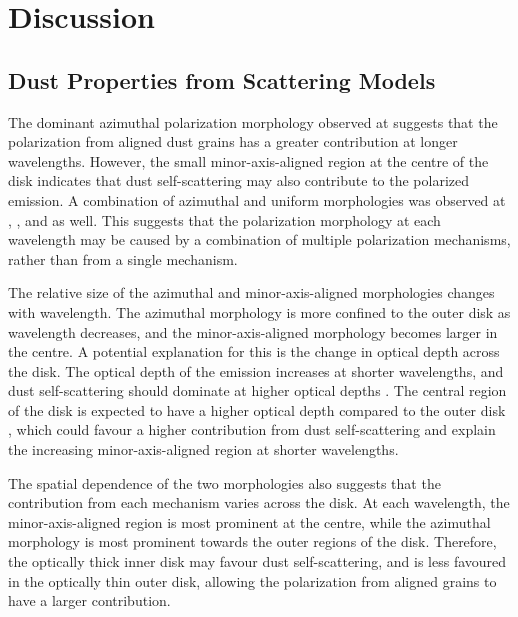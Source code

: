 \chapter{Discussion}
\label{ch_discussion}









\section{Dust Properties from Scattering Models}
The dominant azimuthal polarization morphology observed at \bfour suggests that the polarization from aligned dust grains has a greater contribution at longer wavelengths. However, the small minor-axis-aligned region at the centre of the disk indicates that dust self-scattering may also contribute to the polarized emission. A combination of azimuthal and uniform morphologies was observed at \bfiveNS, \bsixNS, and \bseven as well. This suggests that the polarization morphology at each wavelength may be caused by a combination of multiple polarization mechanisms, rather than from a single mechanism.


The relative size of the azimuthal and minor-axis-aligned morphologies changes with wavelength. The azimuthal morphology is more confined to the outer disk as wavelength decreases, and the minor-axis-aligned morphology becomes larger in the centre. A potential explanation for this is the change in optical depth across the disk. The optical depth of the emission increases at shorter wavelengths, and dust self-scattering should dominate at higher optical depths \citep{Williams, Lin2022}. The central region of the disk is expected to have a higher optical depth compared to the outer disk \citep{Williams}, which could favour a higher contribution from dust self-scattering and explain the increasing minor-axis-aligned region at shorter wavelengths. 

The spatial dependence of the two morphologies also suggests that the contribution from each mechanism varies across the disk. At each wavelength, the minor-axis-aligned region is most prominent at the centre, while the azimuthal morphology is most prominent towards the outer regions of the disk. Therefore, the optically thick inner disk may favour dust self-scattering, and is less favoured in the optically thin outer disk, allowing the polarization from aligned grains to have a larger contribution.






